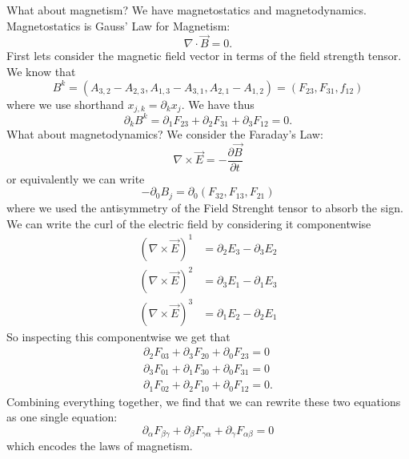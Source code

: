 What about magnetism? We have magnetostatics and
magnetodynamics. Magnetostatics is Gauss' Law for Magnetism:
\begin{equation}%
\nabla\cdot\vec{B} = 0.
\end{equation}
First lets consider the magnetic field vector in terms of the
field strength tensor. We know that
\begin{equation}%
B^{k} = (A_{3,2}-A_{2,3}, A_{1,3}-A_{3,1},A_{2,1}-A_{1,2}) = (F_{23},F_{31},f_{12})
\end{equation}
where we use shorthand $x_{j,k} = \partial_{k}x_{j}$. We have
thus
\begin{equation}%
\partial_{k}B^{k}=\partial_{1}F_{23}+\partial_{2}F_{31}+\partial_{3}F_{12}=0.
\end{equation}
What about magnetodynamics? We consider the Faraday's Law:
\begin{equation}%
\nabla\times\vec{E}=-\frac{\partial\vec{B}}{\partial t}
\end{equation}
or equivalently we can write
\begin{equation}%
-\partial_{0}B_{j}=\partial_{0}(F_{32},F_{13},F_{21})
\end{equation}
where we used the antisymmetry of the Field Strenght tensor to
absorb the sign. We can write the curl of the electric field by
considering it componentwise
\begin{subequations}
\begin{align}
(\nabla\times\vec{E})^{1} &= \partial_{2}E_{3}-\partial_{3}E_{2}\\
(\nabla\times\vec{E})^{2} &= \partial_{3}E_{1}-\partial_{1}E_{3}\\
(\nabla\times\vec{E})^{3} &= \partial_{1}E_{2}-\partial_{2}E_{1}
\end{align}
\end{subequations}
So inspecting this componentwise we get that
\begin{subequations}
\begin{align}
\partial_{2}F_{03}+\partial_{3}F_{20}+\partial_{0}F_{23}=0\\
\partial_{3}F_{01}+\partial_{1}F_{30}+\partial_{0}F_{31}=0\\
\partial_{1}F_{02}+\partial_{2}F_{10}+\partial_{0}F_{12}=0.
\end{align}
\end{subequations}
Combining everything together, we find that we can rewrite these
two equations as one single equation:
\begin{equation}%
\partial_{\alpha}F_{\beta\gamma}+\partial_{\beta}F_{\gamma\alpha}+\partial_{\gamma}F_{\alpha\beta}=0
\end{equation}
which encodes the laws of magnetism.

